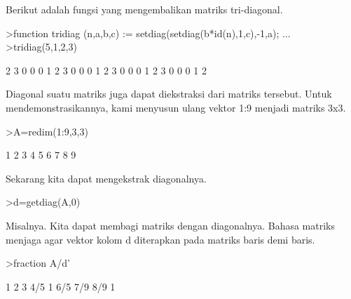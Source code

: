 \documentclass[a4paper,10pt]{article}
\begin{document}
\begin{eulernotebook}
\begin{eulercomment}
\begin{eulercomment}
\begin{eulercomment}
\begin{eulercomment}
\begin{eulercomment}
\begin{eulercomment}
\begin{eulercomment}
\begin{eulercomment}
\begin{eulercomment}
Berikut adalah fungsi yang mengembalikan matriks tri-diagonal.
\end{eulercomment}
\begin{eulerprompt}
>function tridiag (n,a,b,c) := setdiag(setdiag(b*id(n),1,c),-1,a); ...
>tridiag(5,1,2,3)
\end{eulerprompt}
\begin{euleroutput}
              2             3             0             0             0 
              1             2             3             0             0 
              0             1             2             3             0 
              0             0             1             2             3 
              0             0             0             1             2 
\end{euleroutput}
\begin{eulercomment}
Diagonal suatu matriks juga dapat diekstraksi dari matriks tersebut.
Untuk mendemonstrasikannya, kami menyusun ulang vektor 1:9 menjadi
matriks 3x3.
\end{eulercomment}
\begin{eulerprompt}
>A=redim(1:9,3,3)
\end{eulerprompt}
\begin{euleroutput}
              1             2             3 
              4             5             6 
              7             8             9 
\end{euleroutput}
\begin{eulercomment}
Sekarang kita dapat mengekstrak diagonalnya.
\end{eulercomment}
\begin{eulerprompt}
>d=getdiag(A,0)
\end{eulerprompt}
\begin{euleroutput}
  [1,  5,  9]
\end{euleroutput}
\begin{eulercomment}
Misalnya. Kita dapat membagi matriks dengan diagonalnya. Bahasa
matriks menjaga agar vektor kolom d diterapkan pada matriks baris demi
baris.
\end{eulercomment}
\begin{eulerprompt}
>fraction A/d'
\end{eulerprompt}
\begin{euleroutput}
          1         2         3 
        4/5         1       6/5 
        7/9       8/9         1 
\end{euleroutput}
\begin{eulercomment}

\end{eulercomment}
\end{eulercomment}
\end{eulercomment}
\end{eulercomment}
\end{eulercomment}
\end{eulercomment}
\end{eulercomment}
\end{eulercomment}
\end{eulercomment}
\end{eulernotebook}
\end{document}
